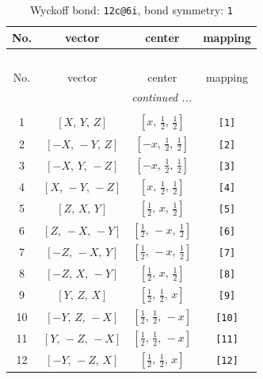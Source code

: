 \documentclass[fleqn,8pt]{jsarticle}
\begin{document}
\begin{longtable}{cccc}
\caption{Wyckoff bond: {\tt 12c@6i}, bond symmetry: {\tt 1}}
 \\
 \hline \hline
No. & vector & center & mapping \\ \hline \endfirsthead

\multicolumn{3}{l}{\tablename\ \thetable{}} \\
 \hline \hline
No. & vector & center & mapping \\ \hline \endhead

 \hline \hline
\multicolumn{3}{r}{\footnotesize\it continued ...} \\ \endfoot

 \hline \hline
\multicolumn{3}{r}{} \\ \endlastfoot

1 & $\left[ X,\, Y,\, Z \right]$ & $\left[ x,\, \frac{1}{2},\, \frac{1}{2} \right]$ & {\tt [1]} \\ \hline
2 & $\left[ - X,\, - Y,\, Z \right]$ & $\left[ - x,\, \frac{1}{2},\, \frac{1}{2} \right]$ & {\tt [2]} \\ \hline
3 & $\left[ - X,\, Y,\, - Z \right]$ & $\left[ - x,\, \frac{1}{2},\, \frac{1}{2} \right]$ & {\tt [3]} \\ \hline
4 & $\left[ X,\, - Y,\, - Z \right]$ & $\left[ x,\, \frac{1}{2},\, \frac{1}{2} \right]$ & {\tt [4]} \\ \hline
5 & $\left[ Z,\, X,\, Y \right]$ & $\left[ \frac{1}{2},\, x,\, \frac{1}{2} \right]$ & {\tt [5]} \\ \hline
6 & $\left[ Z,\, - X,\, - Y \right]$ & $\left[ \frac{1}{2},\, - x,\, \frac{1}{2} \right]$ & {\tt [6]} \\ \hline
7 & $\left[ - Z,\, - X,\, Y \right]$ & $\left[ \frac{1}{2},\, - x,\, \frac{1}{2} \right]$ & {\tt [7]} \\ \hline
8 & $\left[ - Z,\, X,\, - Y \right]$ & $\left[ \frac{1}{2},\, x,\, \frac{1}{2} \right]$ & {\tt [8]} \\ \hline
9 & $\left[ Y,\, Z,\, X \right]$ & $\left[ \frac{1}{2},\, \frac{1}{2},\, x \right]$ & {\tt [9]} \\ \hline
10 & $\left[ - Y,\, Z,\, - X \right]$ & $\left[ \frac{1}{2},\, \frac{1}{2},\, - x \right]$ & {\tt [10]} \\ \hline
11 & $\left[ Y,\, - Z,\, - X \right]$ & $\left[ \frac{1}{2},\, \frac{1}{2},\, - x \right]$ & {\tt [11]} \\ \hline
12 & $\left[ - Y,\, - Z,\, X \right]$ & $\left[ \frac{1}{2},\, \frac{1}{2},\, x \right]$ & {\tt [12]} \\
\end{longtable}
\end{document}
